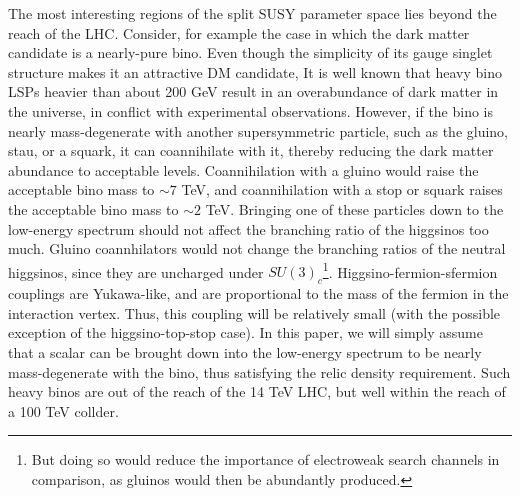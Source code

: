 The most interesting regions of the split SUSY parameter space lies beyond the reach of the LHC. Consider, for example the case in which the dark matter candidate is a nearly-pure bino. Even though the simplicity of its gauge singlet structure makes it an attractive DM candidate, It is well known that heavy bino LSPs heavier than about 200 GeV result in an overabundance of dark matter in the universe, in conflict with experimental observations. However, if the bino is nearly mass-degenerate with another supersymmetric particle, such as the gluino, stau, or a squark, it can coannihilate with it, thereby reducing the dark matter abundance to acceptable levels. Coannihilation with a gluino would raise the acceptable bino mass to $\sim 7$ TeV, and coannihilation with a stop or squark raises the acceptable bino mass to $\sim 2$ TeV. Bringing one of these particles down to the low-energy spectrum should not affect the branching ratio of the higgsinos too much. Gluino coannhilators would not change the branching ratios of the neutral higgsinos, since they are uncharged under $SU(3)_c$\footnote{But doing so would reduce the importance of electroweak search channels in comparison, as gluinos would then be abundantly produced.}. Higgsino-fermion-sfermion couplings are Yukawa-like, and are proportional to the mass of the fermion in the interaction vertex. Thus, this coupling will be relatively small (with the possible exception of the higgsino-top-stop case). In this paper, we will simply assume that a scalar can be brought down into the low-energy spectrum to be nearly mass-degenerate with the bino, thus satisfying the relic density requirement. Such heavy binos are out of the reach of the 14 TeV LHC, but well within the reach of a 100 TeV collder. 


